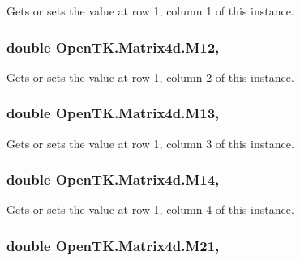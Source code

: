 Gets or sets the value at row 1, column 1 of this instance. 

\hypertarget{struct_open_t_k_1_1_matrix4d_a74e96dc417aab993d5f4b92c3c014cf0}{
\subsubsection[{M12}]{\setlength{\rightskip}{0pt plus 5cm}double Open\-T\-K.\-Matrix4d.\-M12\hspace{0.3cm}{\ttfamily [get]}, {\ttfamily [set]}}}\label{struct_open_t_k_1_1_matrix4d_a74e96dc417aab993d5f4b92c3c014cf0}


Gets or sets the value at row 1, column 2 of this instance. 

\hypertarget{struct_open_t_k_1_1_matrix4d_a70b35dc2bb2896a3ef37f804002e0aa7}{
\subsubsection[{M13}]{\setlength{\rightskip}{0pt plus 5cm}double Open\-T\-K.\-Matrix4d.\-M13\hspace{0.3cm}{\ttfamily [get]}, {\ttfamily [set]}}}\label{struct_open_t_k_1_1_matrix4d_a70b35dc2bb2896a3ef37f804002e0aa7}


Gets or sets the value at row 1, column 3 of this instance. 

\hypertarget{struct_open_t_k_1_1_matrix4d_a351c8abae76bbb11fe14a17ba361e96e}{
\subsubsection[{M14}]{\setlength{\rightskip}{0pt plus 5cm}double Open\-T\-K.\-Matrix4d.\-M14\hspace{0.3cm}{\ttfamily [get]}, {\ttfamily [set]}}}\label{struct_open_t_k_1_1_matrix4d_a351c8abae76bbb11fe14a17ba361e96e}


Gets or sets the value at row 1, column 4 of this instance. 

\hypertarget{struct_open_t_k_1_1_matrix4d_aae11cc1c0ea152a6b62fe9e846989dc0}{
\subsubsection[{M21}]{\setlength{\rightskip}{0pt plus 5cm}double Open\-T\-K.\-Matrix4d.\-M21\hspace{0.3cm}{\ttfamily [get]}, {\ttfamily [set]}}}\label{struct_open_t_k_1_1_matrix4d_aae11cc1c0ea152a6b62fe9e846989dc0}


